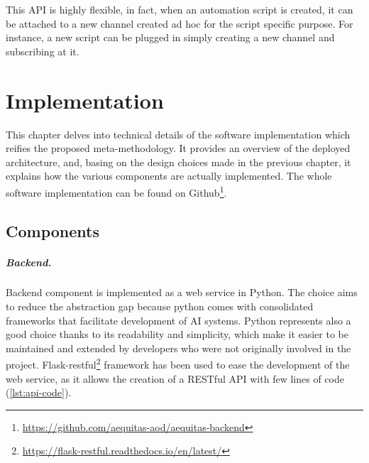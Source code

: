 \documentclass[12pt,a4paper,openright,twoside]{book}
\begin{document}
This API is highly flexible, in fact, when an automation script is created, it can be attached to a new channel created ad hoc for the script specific purpose.
%
For instance, a new script can be plugged in simply  creating a new channel and subscribing at it.




\chapter{Implementation}%
\label{chap:implementation}

This chapter delves into technical details of the software implementation which reifies the proposed meta-methodology.
%
It provides an overview of the deployed architecture, and, basing on the design choices made in the previous chapter, it explains how the various components are actually implemented.
%
The whole software implementation can be found on Github\footnote{\href{https://github.com/aequitas-aod/aequitas-backend}{https://github.com/aequitas-aod/aequitas-backend}}.


\section{Components}


\paragraph{Backend.}


Backend component is implemented as a web service in Python. The choice aims to reduce the abstraction gap because python comes with consolidated frameworks that facilitate development of \ac{AI} systems.
%
Python represents also a good choice thanks to its readability and simplicity, which make it easier to be maintained and extended by developers who were not originally involved in the project.
%
Flask-restful\footnote{\href{https://flask-restful.readthedocs.io/en/latest/}{https://flask-restful.readthedocs.io/en/latest/}} framework has been used to ease the development of the web service, as it allows the creation of a RESTful \ac{API} with few lines of code (\cref{lst:api-code}).
\end{document}
